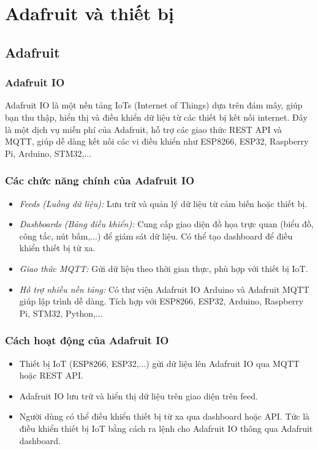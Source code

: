 \section{Adafruit và thiết bị}
\subsection{Adafruit}
\subsubsection{Adafruit IO}
\indent Adafruit IO là một nền tảng IoTs (Internet of Things) dựa trên đám mây, giúp bạn thu thập, hiển thị và điều khiển dữ liệu từ các thiết bị kết nối internet. Đây là một dịch vụ miễn phí của Adafruit, hỗ trợ các giao thức REST API và MQTT, giúp dễ dàng kết nối các vi điều khiển như ESP8266, ESP32, Raspberry Pi, Arduino, STM32,...
\subsubsection{Các chức năng chính của Adafruit IO}
\begin{itemize}[leftmargin = 1cm]
	\item \textit{Feeds (Luồng dữ liệu):} Lưu trữ và quản lý dữ liệu từ cảm biến hoặc thiết bị.
	\item \textit{Dashboards (Bảng điều khiển):} Cung cấp giao diện đồ họa trực quan (biểu đồ, công tắc, nút bấm,...) để giám sát dữ liệu. Có thể tạo dashboard để điều khiển thiết bị từ xa.
	\item \textit{Giao thức MQTT:} Gửi dữ liệu theo thời gian thực, phù hợp với thiết bị IoT.
	\item \textit{Hỗ trợ nhiều nền tảng:} Có thư viện Adafruit IO Arduino và Adafruit MQTT giúp lập trình dễ dàng. Tích hợp với ESP8266, ESP32, Arduino, Raspberry Pi, STM32, Python,...
\end{itemize}
\subsubsection{Cách hoạt động của Adafruit IO}
\begin{itemize}[leftmargin = 1cm]
	\item Thiết bị IoT (ESP8266, ESP32,...) gửi dữ liệu lên Adafruit IO qua MQTT hoặc REST API.
	\item Adafruit IO lưu trữ và hiển thị dữ liệu trên giao diện trên feed.
	\item Người dùng có thể điều khiển thiết bị từ xa qua dashboard hoặc API. Tức là điều khiển thiết bị IoT bằng cách ra lệnh cho Adafruit IO thông qua Adafruit dashboard.
\end{itemize}

